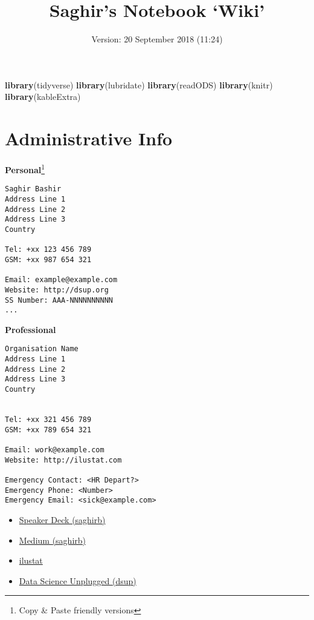 \documentclass[]{book}
\title{Saghir's Notebook `Wiki'}
\author{}
\date{Version: 20 September 2018 (11:24)}
\newenvironment{Shaded}{\begin{snugshade}}{\end{snugshade}}
\newcommand{\KeywordTok}[1]{\textcolor[rgb]{0.13,0.29,0.53}{\textbf{#1}}}
\newcommand{\NormalTok}[1]{#1}
\providecommand{\tightlist}{%
  \setlength{\itemsep}{0pt}\setlength{\parskip}{0pt}}
\let\rmarkdownfootnote\footnote%
\def\footnote{\protect\rmarkdownfootnote}
\theoremstyle{definition}
\theoremstyle{definition}
\theoremstyle{definition}
\theoremstyle{remark}
\begin{document}
\maketitle

{
\setcounter{tocdepth}{1}
\tableofcontents
}
\begin{Shaded}
\begin{Highlighting}[]
\KeywordTok{library}\NormalTok{(tidyverse)}
\KeywordTok{library}\NormalTok{(lubridate)}
\KeywordTok{library}\NormalTok{(readODS)}
\KeywordTok{library}\NormalTok{(knitr)}
\KeywordTok{library}\NormalTok{(kableExtra)}
\end{Highlighting}
\end{Shaded}

\chapter{Administrative Info}\label{administrative-info}

\textbf{Personal}\footnote{Copy \& Paste friendly versions}

\begin{verbatim}
Saghir Bashir
Address Line 1
Address Line 2
Address Line 3
Country

Tel: +xx 123 456 789
GSM: +xx 987 654 321

Email: example@example.com
Website: http://dsup.org
SS Number: AAA-NNNNNNNNNN
...
\end{verbatim}

\textbf{Professional}

\begin{verbatim}
Organisation Name
Address Line 1
Address Line 2
Address Line 3
Country


Tel: +xx 321 456 789
GSM: +xx 789 654 321

Email: work@example.com
Website: http://ilustat.com

Emergency Contact: <HR Depart?>
Emergency Phone: <Number>
Emergency Email: <sick@example.com>
\end{verbatim}

\begin{itemize}
\tightlist
\item
  \href{https://speakerdeck.com/saghirb}{Speaker Deck (saghirb)}
\item
  \href{https://medium.com/@saghirb}{Medium (saghirb)}
\item
  \href{http://ilustat.com/}{ilustat}
\item
  \href{http://dsup.org/}{Data Science Unplugged (dsup)}
\end{itemize}
\end{document}
